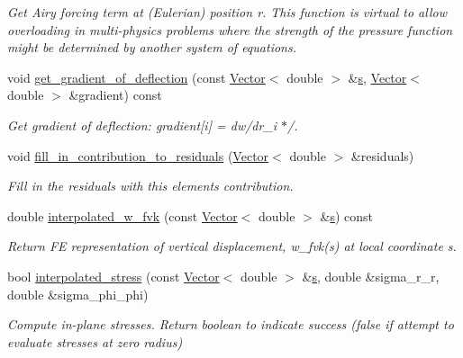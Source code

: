 \begin{DoxyCompactItemize}
\begin{DoxyCompactList}\small\item\em Get Airy forcing term at (Eulerian) position r. This function is virtual to allow overloading in multi-\/physics problems where the strength of the pressure function might be determined by another system of equations. \end{DoxyCompactList}\item 
void \hyperlink{classoomph_1_1AxisymFoepplvonKarmanEquations_a564c34e37df2ed58d16903221528e94c}{get\+\_\+gradient\+\_\+of\+\_\+deflection} (const \hyperlink{classoomph_1_1Vector}{Vector}$<$ double $>$ \&\hyperlink{cfortran_8h_ab7123126e4885ef647dd9c6e3807a21c}{s}, \hyperlink{classoomph_1_1Vector}{Vector}$<$ double $>$ \&gradient) const
\begin{DoxyCompactList}\small\item\em Get gradient of deflection\+: gradient\mbox{[}i\mbox{]} = dw/dr\+\_\+i $\ast$/. \end{DoxyCompactList}\item 
void \hyperlink{classoomph_1_1AxisymFoepplvonKarmanEquations_a18148b60b9a4addc513f1aed354bd63d}{fill\+\_\+in\+\_\+contribution\+\_\+to\+\_\+residuals} (\hyperlink{classoomph_1_1Vector}{Vector}$<$ double $>$ \&residuals)
\begin{DoxyCompactList}\small\item\em Fill in the residuals with this element\textquotesingle{}s contribution. \end{DoxyCompactList}\item 
double \hyperlink{classoomph_1_1AxisymFoepplvonKarmanEquations_aca5188335be3d0432fbf92d493026558}{interpolated\+\_\+w\+\_\+fvk} (const \hyperlink{classoomph_1_1Vector}{Vector}$<$ double $>$ \&\hyperlink{cfortran_8h_ab7123126e4885ef647dd9c6e3807a21c}{s}) const
\begin{DoxyCompactList}\small\item\em Return FE representation of vertical displacement, w\+\_\+fvk(s) at local coordinate s. \end{DoxyCompactList}\item 
bool \hyperlink{classoomph_1_1AxisymFoepplvonKarmanEquations_a3462c52b14649baaea863ea664a41c16}{interpolated\+\_\+stress} (const \hyperlink{classoomph_1_1Vector}{Vector}$<$ double $>$ \&\hyperlink{cfortran_8h_ab7123126e4885ef647dd9c6e3807a21c}{s}, double \&sigma\+\_\+r\+\_\+r, double \&sigma\+\_\+phi\+\_\+phi)
\begin{DoxyCompactList}\small\item\em Compute in-\/plane stresses. Return boolean to indicate success (false if attempt to evaluate stresses at zero radius) \end{DoxyCompactList}\item 

\end{DoxyCompactItemize}
